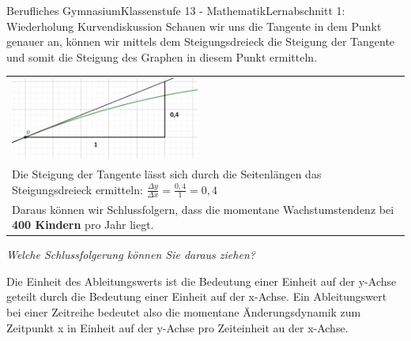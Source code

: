 \documentclass[11pt,twocolumn,oneside,openany,headings=optiontotoc,11pt,numbers=noenddot]{article}
\begin{document}
\begin{worksheet}{Berufliches Gymnasium}{Klassenstufe 13 - Mathematik}{Lernabschnitt 1: Wiederholung Kurvendiskussion}
		Schauen wir uns die Tangente in dem Punkt genauer an, können wir mittels dem Steigungsdreieck die Steigung der Tangente und somit die Steigung des Graphen in diesem Punkt ermitteln.\\
		\par\bigskip\noindent
		\begin{tabularx}{0.48\textwidth}{X}
			\includegraphics[width=0.48\textwidth]{../99_Bilder/KiTa2.png}\\
			Die Steigung der Tangente lässt sich durch die Seitenlängen das Steigungsdreieck ermitteln: \(\frac{\Delta{}y}{\Delta{}x}= \frac{0,4}{1} = 0,4\)\\
			Daraus können wir Schlussfolgern, dass die momentane Wachstumstendenz bei \textbf{400 Kindern} pro Jahr liegt.\\
		\end{tabularx}
		\par\bigskip\noindent
		\textit{Welche Schlussfolgerung können Sie daraus ziehen?}\\
		\par\bigskip\noindent
		\begin{framed}
			Die Einheit des Ableitungswerts ist die Bedeutung einer Einheit auf der y-Achse geteilt durch die Bedeutung einer Einheit auf der x-Achse. Ein Ableitungswert bei einer Zeitreihe bedeutet also die momentane Änderungsdynamik zum Zeitpunkt x in \glqq{}Einheit auf der y-Achse\grqq{} pro \glqq{}Zeiteinheit au der x-Achse\grqq{}.
		\end{framed}

\end{worksheet}
\end{document}
